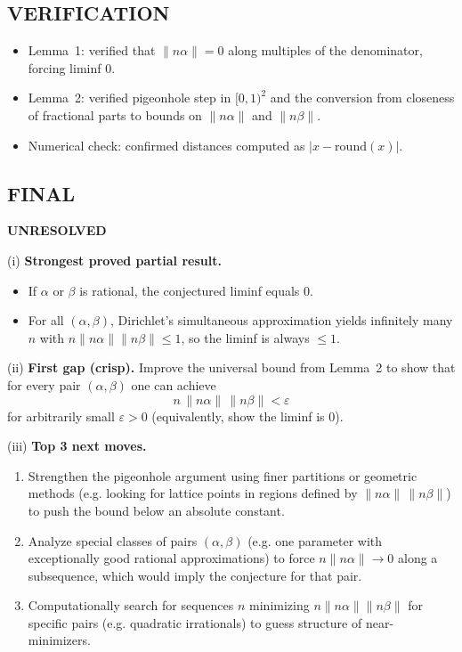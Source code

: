 \subsection*{VERIFICATION}
\begin{itemize}
\item Lemma~1: verified that $\|n\alpha\|=0$ along multiples of the denominator, forcing liminf $0$.
\item Lemma~2: verified pigeonhole step in $[0,1)^2$ and the conversion from closeness of fractional parts to bounds on $\|n\alpha\|$ and $\|n\beta\|$.
\item Numerical check: confirmed distances computed as $|x-\mathrm{round}(x)|$.
\end{itemize}

\subsection*{FINAL}
\textbf{UNRESOLVED}

(i) \textbf{Strongest proved partial result.}
\begin{itemize}
\item If $\alpha$ or $\beta$ is rational, the conjectured liminf equals $0$.
\item For all $(\alpha,\beta)$, Dirichlet's simultaneous approximation yields infinitely many $n$ with $n\|n\alpha\|\|n\beta\|\le 1$, so the liminf is always $\le 1$.
\end{itemize}

(ii) \textbf{First gap (crisp).} Improve the universal bound from Lemma~2 to show that for every pair $(\alpha,\beta)$ one can achieve
\[n\,\|n\alpha\|\,\|n\beta\| < \varepsilon\]
for arbitrarily small $\varepsilon>0$ (equivalently, show the liminf is $0$).

(iii) \textbf{Top 3 next moves.}
\begin{enumerate}
\item Strengthen the pigeonhole argument using finer partitions or geometric methods (e.g. looking for lattice points in regions defined by $\|n\alpha\|\,\|n\beta\|$) to push the bound below an absolute constant.
\item Analyze special classes of pairs $(\alpha,\beta)$ (e.g. one parameter with exceptionally good rational approximations) to force $n\|n\alpha\|\to 0$ along a subsequence, which would imply the conjecture for that pair.
\item Computationally search for sequences $n$ minimizing $n\|n\alpha\|\|n\beta\|$ for specific pairs (e.g. quadratic irrationals) to guess structure of near-minimizers.
\end{enumerate}

